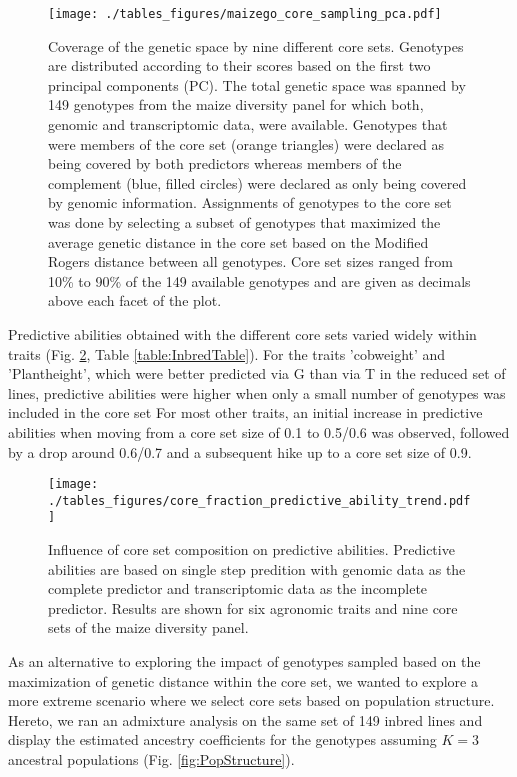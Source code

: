 \documentclass[12pt,titlepage]{article}
\begin{document}
\begin{figure}[H]
\centering
\texttt{[image: ./tables\_figures/maizego\_core\_sampling\_pca.pdf]}
\caption{
  Coverage of the genetic space by nine different core sets. 
  Genotypes are distributed according to their scores based on the first two
  principal components (PC).
  The total genetic space was spanned by 149 genotypes from the maize diversity 
  panel for which both, genomic and transcriptomic data, were available.
  Genotypes that were members of the core set (orange triangles) were declared 
  as being covered by both predictors whereas members of the complement (blue,
  filled circles) were declared as only being covered by genomic information.
  Assignments of genotypes to the core set was done by selecting a subset of
  genotypes that maximized the average genetic distance in the core set based 
  on the Modified Rogers distance between all genotypes.
  Core set sizes ranged from 10\% to 90\% of the 149 available genotypes and
  are given as decimals above each facet of the plot.
}
\label{fig:CoreSetPCA}
\end{figure}


Predictive abilities obtained with the different core sets varied widely within
traits (Fig. \ref{fig:CoreSetInfluence}, Table \ref{table:InbredTable}).
For the traits 'cobweight' and 'Plantheight', which were better predicted via G
than via T in the reduced set of lines, predictive abilities were higher when
only a small number of genotypes was included in the core set
For most other traits, an initial increase in predictive abilities when moving
from a core set size of 0.1 to 0.5/0.6 was observed, followed by a drop around
0.6/0.7 and a subsequent hike up to a core set size of 0.9.



\begin{figure}[H]
\centering
\texttt{[image: ./tables\_figures/core\_fraction\_predictive\_ability\_trend.pdf]}
\caption{
Influence of core set composition on predictive abilities.
Predictive abilities are based on single step predition with genomic data as the 
complete predictor and transcriptomic data as the incomplete predictor.
Results are shown for six agronomic traits and nine core sets of the maize 
diversity panel.
}
\label{fig:CoreSetInfluence}
\end{figure}


As an alternative to exploring the impact of genotypes sampled based on the
maximization of genetic distance within the core set, we wanted to explore a
more extreme scenario where we select core sets based on population structure.
Hereto, we ran an admixture analysis on the same set of 149 inbred lines and
display the estimated ancestry coefficients for the genotypes assuming $K=3$
ancestral populations (Fig. \ref{fig:PopStructure}).
\end{document}
